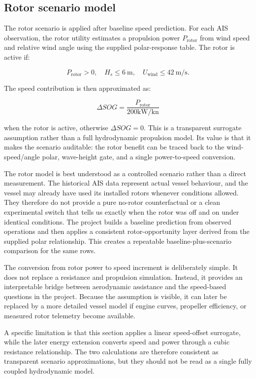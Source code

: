\documentclass[10pt,a4paper]{article}
\newcommand{\kn}{\ensuremath{\mathrm{kn}}}
\newcommand{\kw}{\ensuremath{\mathrm{kW}}}
\newcommand{\sog}{SOG}
\begin{document}
\subsection{Rotor scenario model}

The rotor scenario is applied after baseline speed prediction. For each AIS
observation, the rotor utility estimates a propulsion power
$P_\mathrm{rotor}$ from wind speed and relative wind angle using the supplied
polar-response table. The rotor is active if:

\[
P_\mathrm{rotor} > 0,\quad H_s \leq 6 \mathrm{\ m},\quad
U_\mathrm{wind} \leq 42 \mathrm{\ m/s}.
\]

The speed contribution is then approximated as:

\[
\Delta \sog = \frac{P_\mathrm{rotor}}{200 \kw / \kn}
\]

when the rotor is active, otherwise $\Delta \sog = 0$. This is a transparent
surrogate assumption rather than a full hydrodynamic propulsion model. Its value
is that it makes the scenario auditable: the rotor benefit can be traced back to
the wind-speed/angle polar, wave-height gate, and a single power-to-speed
conversion.

The rotor model is best understood as a controlled scenario rather than a direct
measurement. The historical AIS data represent actual vessel behaviour, and the
vessel may already have used its installed rotors whenever conditions allowed.
They therefore do not provide a pure no-rotor counterfactual or a clean
experimental switch that tells us exactly when the rotor was off and on under
identical conditions. The project builds a baseline prediction from observed
operations and then applies a consistent rotor-opportunity layer derived from
the supplied polar relationship. This creates a repeatable baseline-plus-scenario
comparison for the same rows.

The conversion from rotor power to speed increment is deliberately simple. It
does not replace a resistance and propulsion simulation. Instead, it provides an
interpretable bridge between aerodynamic assistance and the speed-based
questions in the project. Because the assumption is visible, it can later
be replaced by a more detailed vessel model if engine curves, propeller
efficiency, or measured rotor telemetry become available.

A specific limitation is that this section applies a linear speed-offset
surrogate, while the later energy extension converts speed and power through a
cubic resistance relationship. The two calculations are therefore consistent as
transparent scenario approximations, but they should not be read as a single
fully coupled hydrodynamic model.
\end{document}
